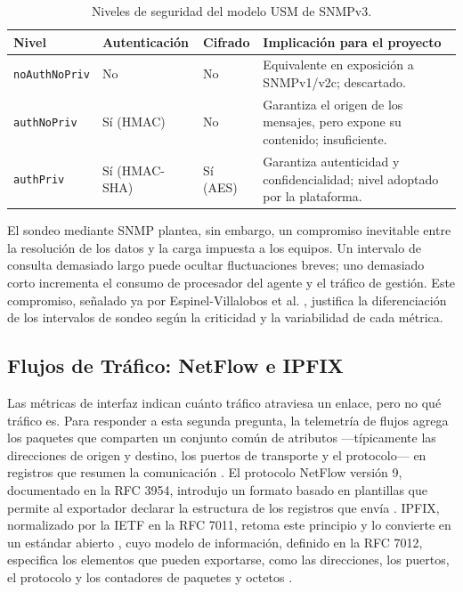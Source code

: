 \begin{table}[htbp]
  \centering
  \footnotesize
  \caption{Niveles de seguridad del modelo USM de SNMPv3.}
  \label{tab:snmp_niveles}
  \renewcommand{\arraystretch}{1.2}
  \begin{tabular}{|p{2.4cm}|p{2.7cm}|p{1.8cm}|p{5.5cm}|}
    \hline
    \textbf{Nivel} & \textbf{Autenticación} & \textbf{Cifrado} & \textbf{Implicación para el proyecto} \\
    \hline
    \texttt{noAuthNoPriv} & No & No & Equivalente en exposición a SNMPv1/v2c; descartado. \\
    \hline
    \texttt{authNoPriv} & Sí (HMAC) & No & Garantiza el origen de los mensajes, pero expone su contenido; insuficiente. \\
    \hline
    \texttt{authPriv} & Sí (HMAC-SHA) & Sí (AES) & Garantiza autenticidad y confidencialidad; nivel adoptado por la plataforma. \\
    \hline
  \end{tabular}
  \par\vspace{1.5mm}
\end{table}

El sondeo mediante SNMP plantea, sin embargo, un compromiso inevitable entre la resolución de los datos y la carga impuesta a los equipos. Un intervalo de consulta demasiado largo puede ocultar fluctuaciones breves; uno demasiado corto incrementa el consumo de procesador del agente y el tráfico de gestión. Este compromiso, señalado ya por Espinel-Villalobos et al. \cite{espinel2022design}, justifica la diferenciación de los intervalos de sondeo según la criticidad y la variabilidad de cada métrica.

\subsection{Flujos de Tráfico: NetFlow e IPFIX}

Las métricas de interfaz indican cuánto tráfico atraviesa un enlace, pero no qué tráfico es. Para responder a esta segunda pregunta, la telemetría de flujos agrega los paquetes que comparten un conjunto común de atributos ---típicamente las direcciones de origen y destino, los puertos de transporte y el protocolo--- en registros que resumen la comunicación \cite{hofstede2014flow}. El protocolo NetFlow versión 9, documentado en la RFC 3954, introdujo un formato basado en plantillas que permite al exportador declarar la estructura de los registros que envía \cite{claise2004netflow}. IPFIX, normalizado por la IETF en la RFC 7011, retoma este principio y lo convierte en un estándar abierto \cite{claise2013ipfix}, cuyo modelo de información, definido en la RFC 7012, especifica los elementos que pueden exportarse, como las direcciones, los puertos, el protocolo y los contadores de paquetes y octetos \cite{claise2013ipfixim}.

